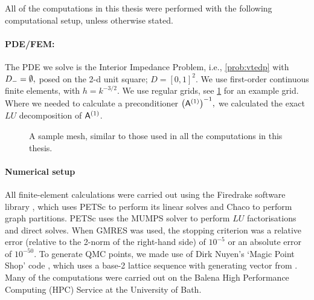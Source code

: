 All of the computations in this thesis were performed with the following computational setup, unless otherwise stated.

\paragraph{PDE/FEM:}
The PDE we solve is the Interior Impedance Problem, i.e., \cref{prob:vtedp} with $D_{-} = \emptyset,$ posed on the 2-d unit square; $D = [0,1]^2.$ We use first-order continuous finite elements, with $h = k^{-3/2}$. We use regular grids, see \cref{fig:grid} for an example grid. Where we needed to calculate a preconditioner $\AmatoI,$ we calculated the exact $LU$ decomposition of $\mathsf{A}^{(1)}$.

\begin{figure}[h]
  \centering
  
  \caption{A sample mesh, similar to those used in all the computations in this thesis.\label{fig:grid}}
  \end{figure}

\paragraph{Numerical setup}
All finite-element calculations were carried out using the Firedrake software library \cite{RaHaMiLaLuMcBeMaKe:16,LuVaRaBeRaHaKe:15}, which uses PETSc to perform its linear solves \cite{BaAbAsBrBrBuDaEiGrKaKnMaMcMiMuRuSaSmZaZhZh:18,BaGrMcSm:97,DaPaKlCo:11,BaAbAdBrBrBuDaDeEiGrKaKaKnMaMcMiMuRuSaSmZaZh:19} and Chaco \cite{HeLe:95} to perform graph partitions. PETSc uses the MUMPS \cite{AmDuLEKo:01,AmGuLEPr:06} solver to perform $LU$ factorisations and direct solves. When GMRES was used, the stopping criterion was a relative error (relative to the 2-norm of the right-hand side) of $10^{-5}$ or an absolute error of $10^{-50}.$ To generate QMC points, we made use of Dirk Nuyen's `Magic Point Shop' code \cite{Nu,KuNu:16}, which uses a base-2 lattice sequence with generating vector from \cite{CoKuNu:06}. Many of the computations were carried out on the Balena High Performance Computing (HPC) Service at the University of Bath.
